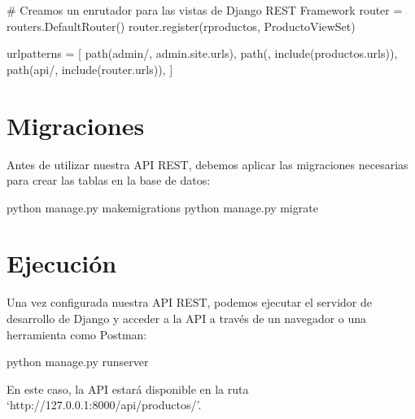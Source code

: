 \documentclass[
  a4paper,
  DIV=11,
  numbers=noendperiod,
  onepage,
  openany]{scrreprt}
\newenvironment{Shaded}{\begin{snugshade}}{\end{snugshade}}
\newcommand{\CommentTok}[1]{\textcolor[rgb]{0.37,0.37,0.37}{#1}}
\newcommand{\ExtensionTok}[1]{\textcolor[rgb]{0.00,0.23,0.31}{#1}}
\newcommand{\NormalTok}[1]{\textcolor[rgb]{0.00,0.23,0.31}{#1}}
\newcommand{\OperatorTok}[1]{\textcolor[rgb]{0.37,0.37,0.37}{#1}}
\newcommand{\StringTok}[1]{\textcolor[rgb]{0.13,0.47,0.30}{#1}}
\newcommand{\VerbatimStringTok}[1]{\textcolor[rgb]{0.13,0.47,0.30}{#1}}
\begin{document}
\begin{tcolorbox}
\begin{Shaded}
\begin{Highlighting}[]
\CommentTok{\# Creamos un enrutador para las vistas de Django REST Framework}
\NormalTok{router }\OperatorTok{=}\NormalTok{ routers.DefaultRouter()}
\NormalTok{router.register(}\VerbatimStringTok{r\textquotesingle{}productos\textquotesingle{}}\NormalTok{, ProductoViewSet)}

\NormalTok{urlpatterns }\OperatorTok{=}\NormalTok{ [}
\NormalTok{    path(}\StringTok{\textquotesingle{}admin/\textquotesingle{}}\NormalTok{, admin.site.urls),}
\NormalTok{    path(}\StringTok{\textquotesingle{}\textquotesingle{}}\NormalTok{, include(}\StringTok{\textquotesingle{}productos.urls\textquotesingle{}}\NormalTok{)),}
\NormalTok{    path(}\StringTok{\textquotesingle{}api/\textquotesingle{}}\NormalTok{, include(router.urls)),}
\NormalTok{]}
\end{Highlighting}
\end{Shaded}

\section{Migraciones}\label{migraciones}

Antes de utilizar nuestra API REST, debemos aplicar las migraciones
necesarias para crear las tablas en la base de datos:

\begin{Shaded}
\begin{Highlighting}[]
\ExtensionTok{python}\NormalTok{ manage.py makemigrations}
\ExtensionTok{python}\NormalTok{ manage.py migrate}
\end{Highlighting}
\end{Shaded}

\section{Ejecución}\label{ejecuciuxf3n-1}

Una vez configurada nuestra API REST, podemos ejecutar el servidor de
desarrollo de Django y acceder a la API a través de un navegador o una
herramienta como Postman:

\begin{Shaded}
\begin{Highlighting}[]
\ExtensionTok{python}\NormalTok{ manage.py runserver}
\end{Highlighting}
\end{Shaded}

En este caso, la API estará disponible en la ruta
`http://127.0.0.1:8000/api/productos/'.


\end{tcolorbox}
\end{document}
